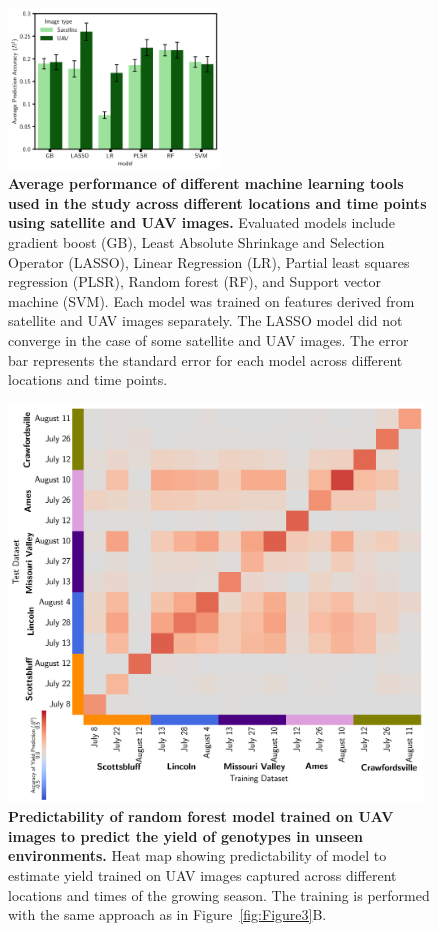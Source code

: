 \documentclass[12pt,twoside]{gsag3jnl}
\begin{document}
\begin{figure}[h!]
\centering
\includegraphics[width=0.50\textwidth]{SupplementalFigures/AverageAcc_Models.png}
\caption{\textbf{Average performance of different machine learning tools used in the study across different locations and time points using satellite and UAV images.} Evaluated models include gradient boost (GB), Least Absolute Shrinkage and Selection Operator (LASSO), Linear Regression (LR), Partial least squares regression (PLSR), Random forest (RF), and Support vector machine (SVM). Each model was trained on features derived from satellite and UAV images separately. The LASSO model did not converge in the case of some satellite and UAV images.
The error bar represents the standard error for each model across different locations and time points.}
\label{fig:averagemodelperformance}
\end{figure}


\begin{figure}[h!]
\centering
\includegraphics[width=0.98\textwidth]{SupplementalFigures/Fiigure3B_yieldperacre_UAV.png}
\caption{\textbf{Predictability of random forest model trained on UAV images to predict the yield of genotypes in unseen environments.} Heat map showing predictability of model to estimate yield trained on UAV images
captured across different locations and times of the growing season. The training is performed with the same approach as in Figure~\ref{fig:Figure3}B.
}
\label{fig:modelperformanceUAV}
\end{figure}




\newpage

% 
\end{document}
